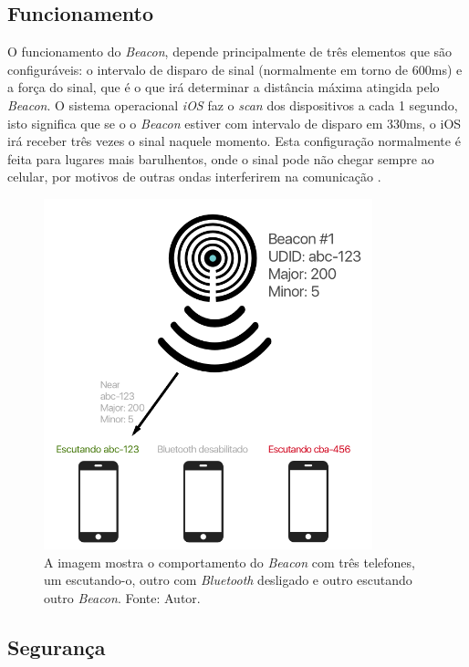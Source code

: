 \documentclass[
	12pt,
	oneside,
	a4paper,
	english,
	brazil,
]{abntex2}
\begin{document}
\subsection{Funcionamento}

O funcionamento do \emph{Beacon}, depende principalmente de três elementos que são configuráveis: o intervalo de disparo de sinal (normalmente em torno de 600ms) e a força do sinal, que é o que irá determinar a distância máxima atingida pelo \emph{Beacon}. O sistema operacional \emph{iOS} faz o \emph{scan} dos dispositivos a cada 1 segundo, isto significa que se o o \emph{Beacon} estiver com intervalo de disparo em 330ms, o iOS irá receber três vezes o sinal naquele momento. Esta configuração normalmente é feita para lugares mais barulhentos, onde o sinal pode não chegar sempre ao celular, por motivos de outras ondas interferirem na comunicação \cite{beacon-how-it-works-estimote}.

\begin{figure}[h]
\centering
\includegraphics[width=0.85\textwidth]{beacon-how-it-works}
    \caption{
        A imagem mostra o comportamento do \emph{Beacon} com três telefones, um escutando-o, outro com \emph{Bluetooth} desligado e outro escutando outro \emph{Beacon}. Fonte: Autor.
    }
\end{figure}

\subsection{Segurança}
\end{document}
